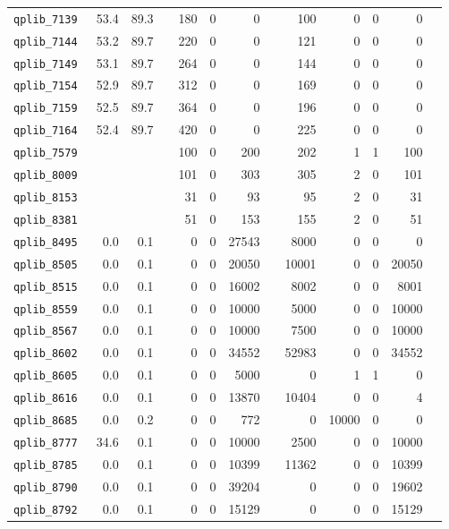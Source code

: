 {\begin{longtable}{lrrrrrrrrrrrr}
{\tt 	qplib\_7139	}	&	53.4	&	89.3	&	&	180	&	0	&	0	&	&	100	&	0	&	0	&	0	\\
{\tt 	qplib\_7144	}	&	53.2	&	89.7	&	&	220	&	0	&	0	&	&	121	&	0	&	0	&	0	\\
{\tt 	qplib\_7149	}	&	53.1	&	89.7	&	&	264	&	0	&	0	&	&	144	&	0	&	0	&	0	\\
{\tt 	qplib\_7154	}	&	52.9	&	89.7	&	&	312	&	0	&	0	&	&	169	&	0	&	0	&	0	\\
{\tt 	qplib\_7159	}	&	52.5	&	89.7	&	&	364	&	0	&	0	&	&	196	&	0	&	0	&	0	\\
{\tt 	qplib\_7164	}	&	52.4	&	89.7	&	&	420	&	0	&	0	&	&	225	&	0	&	0	&	0	\\
{\tt 	qplib\_7579	}	&		&		&	&	100	&	0	&	200	&	&	202	&	1	&	1	&	100	\\
{\tt 	qplib\_8009	}	&		&		&	&	101	&	0	&	303	&	&	305	&	2	&	0	&	101	\\
{\tt 	qplib\_8153	}	&		&		&	&	31	&	0	&	93	&	&	95	&	2	&	0	&	31	\\
{\tt 	qplib\_8381	}	&		&		&	&	51	&	0	&	153	&	&	155	&	2	&	0	&	51	\\
{\tt 	qplib\_8495	}	&	0.0	&	0.1	&	&	0	&	0	&	27543	&	&	8000	&	0	&	0	&	0	\\
{\tt 	qplib\_8505	}	&	0.0	&	0.1	&	&	0	&	0	&	20050	&	&	10001	&	0	&	0	&	20050	\\
{\tt 	qplib\_8515	}	&	0.0	&	0.1	&	&	0	&	0	&	16002	&	&	8002	&	0	&	0	&	8001	\\
{\tt 	qplib\_8559	}	&	0.0	&	0.1	&	&	0	&	0	&	10000	&	&	5000	&	0	&	0	&	10000	\\
{\tt 	qplib\_8567	}	&	0.0	&	0.1	&	&	0	&	0	&	10000	&	&	7500	&	0	&	0	&	10000	\\
{\tt 	qplib\_8602	}	&	0.0	&	0.1	&	&	0	&	0	&	34552	&	&	52983	&	0	&	0	&	34552	\\
{\tt 	qplib\_8605	}	&	0.0	&	0.1	&	&	0	&	0	&	5000	&	&	0	&	1	&	1	&	0	\\
{\tt 	qplib\_8616	}	&	0.0	&	0.1	&	&	0	&	0	&	13870	&	&	10404	&	0	&	0	&	4	\\
{\tt 	qplib\_8685	}	&	0.0	&	0.2	&	&	0	&	0	&	772	&	&	0	&	10000	&	0	&	0	\\
{\tt 	qplib\_8777	}	&	34.6	&	0.1	&	&	0	&	0	&	10000	&	&	2500	&	0	&	0	&	10000	\\
{\tt 	qplib\_8785	}	&	0.0	&	0.1	&	&	0	&	0	&	10399	&	&	11362	&	0	&	0	&	10399	\\
{\tt 	qplib\_8790	}	&	0.0	&	0.1	&	&	0	&	0	&	39204	&	&	0	&	0	&	0	&	19602	\\
{\tt 	qplib\_8792	}	&	0.0	&	0.1	&	&	0	&	0	&	15129	&	&	0	&	0	&	0	&	15129	\\

\end{longtable}}
